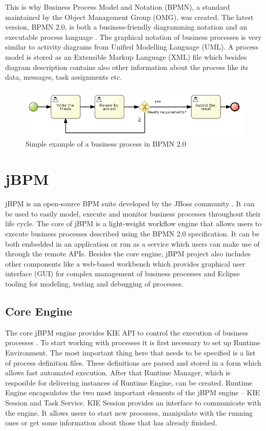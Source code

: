 \documentclass[12pt,oneside,final]{fithesis2}
\begin{document}
This is why Business Process Model and Notation (BPMN), a standard maintained by the Object Management Group (OMG), was created.
The latest version, BPMN 2.0, is both a business-friendly diagramming notation and an executable process language \cite{silver11}.
The graphical notation of business processes is very similar to activity diagrams from Unified Modelling Language (UML).
A process model is stored as an Extensible Markup Language (XML) file which besides diagram description contains also other information about the process like its data, messages, task assignments etc.

\begin{figure}[ht!]
\centering
\includegraphics[width=\textwidth]{images/process-example.png}
\caption{Simple example of a business process in BPMN 2.0}
\label{fig:process-example}
\end{figure}

\section{jBPM}
jBPM is an open-source BPM suite developed by the JBoss community \cite{jbpm6overview}.
It can be used to easily model, execute and monitor business processes throughout their life cycle.
The core of jBPM is a light-weight workflow engine that allows users to execute business processes described using the BPMN 2.0 specification.
It can be both embedded in an application or run as a service which users can make use of through the remote APIs.
Besides the core engine, jBPM project also includes other components like a web-based workbench which provides graphical user interface (GUI) for complex management of business processes and Eclipse\footnotemark{} tooling for modeling, testing and debugging of processes.

\subsection{Core Engine}
\label{subsec:core-engine}
The core jBPM engine provides KIE\footnotemark{} API to control the execution of business processes \cite{jbpm6api,jbpm6engine}.
To start working with processes it is first necessary to set up Runtime Environment.
The most important thing here that needs to be specified is a list of process definition files.
These definitions are parsed and stored in a form which allows fast automated execution.
After that Runtime Manager, which is resposible for delivering instances of Runtime Engine, can be created.
Runtime Engine encapsulates the two most important elements of the jBPM engine -- KIE Session and Task Service.
KIE Session provides an interface to communicate with the engine.
It allows users to start new processes, manipulate with the running ones or get some information about those that has already finished.
\end{document}
